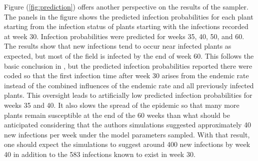 \documentclass{uwstat572}
\begin{document}
Figure (\ref{fig:prediction}) offers another perspective on the results of the sampler. 
The panels in the figure shows the predicted infection probabilities for each plant starting from the infection status of plants starting with the infections recorded at week 30. 
Infection probabilities were predicted for weeks 35, 40, 50, and 60. 
The results show that new infections tend to occur near infected plants as expected, but most of the field is infected by the end of week 60. 
This follows the basic conclusion in \citet{Brown}, but the predicted infection probabilities reported there were coded so that the first infection time after week 30 arises from the endemic rate instead of the combined influences of the endemic rate and all previously infected plants.
This oversight leads to artificially low predicted infection probabilities for weeks 35 and 40. 
It also slows the spread of the epidemic so that many more plants remain susceptible at the end of the 60 weeks than what should be anticipated considering that the authors simulations suggested approximately 40 new infections per week under the model parameters sampled. 
With that result, one should expect the simulations to suggest around 400 new infections by week 40 in addition to the 583 infections known to exist in week 30. 
\end{document}
